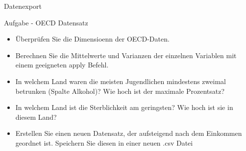 \documentclass[ignorenonframetext,]{beamer}
\begin{document}
\begin{frame}[fragile]{Datenexport}
\begin{block}{Aufgabe - OECD Datensatz}
\begin{itemize}
\item
  Überprüfen Sie die Dimensioenn der OECD-Daten.
\item
  Berechnen Sie die Mittelwerte und Varianzen der einzelnen Variablen
  mit einem geeigneten apply Befehl.
\item
  In welchem Land waren die meisten Jugendlichen mindestens zweimal
  betrunken (Spalte Alkohol)? Wie hoch ist der maximale Prozentsatz?
\item
  In welchem Land ist die Sterblichkeit am geringsten? Wie hoch ist sie
  in diesem Land?
\item
  Erstellen Sie einen neuen Datensatz, der aufsteigend nach dem
  Einkommen geordnet ist. Speichern Sie diesen in einer neuen .csv Datei
\end{itemize}

\end{block}

\end{frame}
\end{document}
